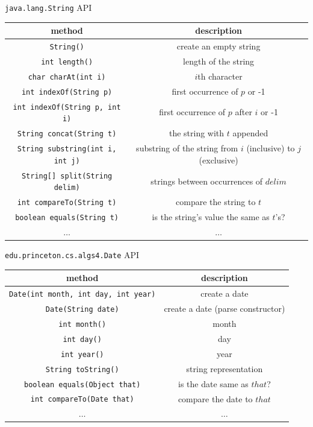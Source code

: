 \documentclass[8pt,a4paper,compress]{beamer}
\begin{document}
\begin{frame}[fragile]
\pause

\lstinline{java.lang.String} API
\begin{center}
\begin{tabular}{cc}
method & description \\ \hline
\lstinline$String()$ & create an empty string \\
\lstinline$int length()$ & length of the string \\
\lstinline$char charAt(int i)$ & $i$th character \\
\lstinline$int indexOf(String p)$ & first occurrence of $p$ or -1 \\ \lstinline$int indexOf(String p, int i)$ & first occurrence of $p$ after $i$ or -1 \\
\lstinline$String concat(String t)$ & the string with $t$ appended \\
\lstinline$String substring(int i, int j)$ & substring of the string from $i$ (inclusive) to $j$ (exclusive) \\
\lstinline$String[] split(String delim)$ & strings between occurrences of $delim$ \\
\lstinline$int compareTo(String t)$ & compare the string to $t$ \\
\lstinline$boolean equals(String t)$ & is the string's value the same as $t$'s? \\
$\dots$ & $\dots$
\end{tabular} 
\end{center}
\end{frame}

\begin{frame}[fragile]
\pause

\lstinline{edu.princeton.cs.algs4.Date} API
\begin{center}
\begin{tabular}{cc}
method & description \\ \hline
\lstinline$Date(int month, int day, int year)$ & create a date \\
\lstinline$Date(String date)$ & create a date (parse constructor) \\
\lstinline$int month()$ &  month \\
\lstinline$int day()$ & day \\
\lstinline$int year()$ & year \\
\lstinline$String toString()$ & string representation \\
\lstinline$boolean equals(Object that)$ & is the date same as $that$? \\
\lstinline$int compareTo(Date that)$ & compare the date to $that$ \\
$\dots$ & $\dots$
\end{tabular} 
\end{center}
\end{frame}
\end{document}
